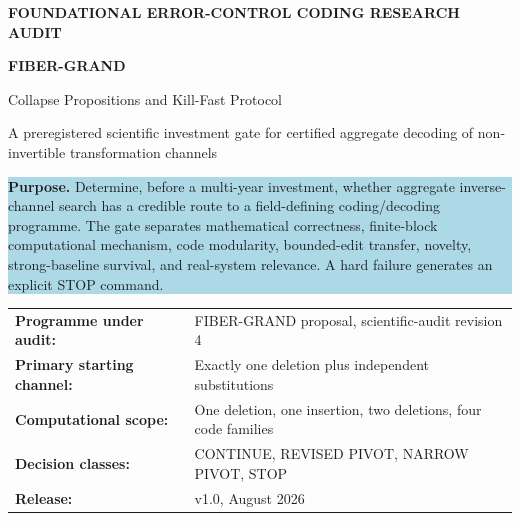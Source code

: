 \documentclass[11pt]{article}
\begin{document}
\begin{titlepage}
\centering
\vspace*{1.2cm}
{\Large\bfseries\color{navy} FOUNDATIONAL ERROR-CONTROL CODING RESEARCH AUDIT\par}
\vspace{1.4cm}
{\Huge\bfseries\color{navy} FIBER-GRAND\par}
\vspace{0.35cm}
{\LARGE Collapse Propositions and Kill-Fast Protocol\par}
\vspace{0.75cm}
{\large A preregistered scientific investment gate for certified aggregate decoding of non-invertible transformation channels\par}
\vspace{1.2cm}
\begin{minipage}{0.88\textwidth}
\colorbox{lightblue}{\parbox{0.94\textwidth}{
\textbf{Purpose.} Determine, before a multi-year investment, whether aggregate inverse-channel search has a credible route to a field-defining coding/decoding programme. The gate separates mathematical correctness, finite-block computational mechanism, code modularity, bounded-edit transfer, novelty, strong-baseline survival, and real-system relevance. A hard failure generates an explicit STOP command.
}}
\end{minipage}
\vfill
\begin{tabular}{@{}ll@{}}
\textbf{Programme under audit:} & FIBER-GRAND proposal, scientific-audit revision 4 \\
\textbf{Primary starting channel:} & Exactly one deletion plus independent substitutions \\
\textbf{Computational scope:} & One deletion, one insertion, two deletions, four code families \\
\textbf{Decision classes:} & CONTINUE, REVISED PIVOT, NARROW PIVOT, STOP \\
\textbf{Release:} & v1.0, August 2026
\end{tabular}
\vspace{1cm}
\end{titlepage}
\end{document}
